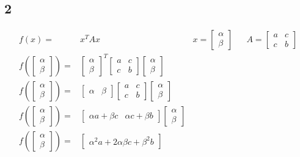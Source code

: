\documentclass[11pt]{article}
\begin{document}
		\subsection*{2}
			\begin{align}
				f(x)=&x^T Ax &x=\begin{bmatrix} \alpha \\\beta \end{bmatrix} &&A=\begin{bmatrix} a & c \\ c & b \end{bmatrix}\\
				f(\begin{bmatrix} \alpha \\\beta \end{bmatrix})=&\begin{bmatrix} \alpha \\\beta \end{bmatrix}^T\begin{bmatrix} a & c \\ c & b \end{bmatrix}\begin{bmatrix} \alpha \\\beta \end{bmatrix} \\
				f(\begin{bmatrix} \alpha \\\beta \end{bmatrix})=&\begin{bmatrix} \alpha &\beta \end{bmatrix}\begin{bmatrix} a & c \\ c & b \end{bmatrix}\begin{bmatrix} \alpha \\\beta \end{bmatrix} \\
				f(\begin{bmatrix} \alpha \\\beta \end{bmatrix})=&\begin{bmatrix} \alpha a +\beta c & \alpha c + \beta b \end{bmatrix}\begin{bmatrix} \alpha \\\beta \end{bmatrix} \\
				f(\begin{bmatrix} \alpha \\\beta \end{bmatrix})=&\begin{bmatrix} \alpha^2 a + 2\alpha\beta c +\beta^2b \end{bmatrix} \\

\end{align}
\end{document}

